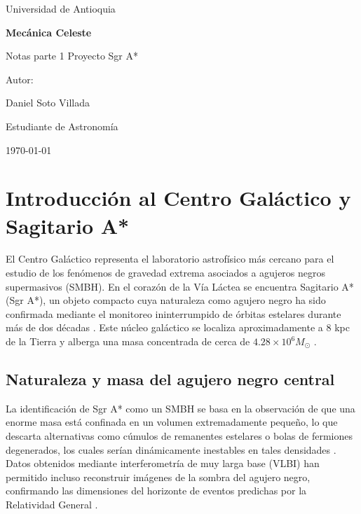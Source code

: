 \documentclass[a4paper]{article}
\begin{document}
\begin{titlepage}
  \centering
  {\Large Universidad de Antioquia\par}
  \vspace{2cm}
  {\huge\bfseries Mecánica Celeste\par}
  \vspace{0.4cm}
  {\Large Notas parte 1 Proyecto Sgr A*\par}
  \vspace{2.5cm}
  {\large Autor:\par}
  \vspace{0.2cm}
  {\large Daniel Soto Villada\par}
  {\large Estudiante de Astronomía\par}
  \vfill
  {\large \today\par}
\end{titlepage}

\newpage
\tableofcontents
\newpage

\section{Introducción al Centro Galáctico y Sagitario A*}

El Centro Galáctico representa el laboratorio astrofísico más cercano para el estudio de los fenómenos de gravedad extrema asociados a agujeros negros supermasivos (SMBH). En el corazón de la Vía Láctea se encuentra Sagitario A* (Sgr A*), un objeto compacto cuya naturaleza como agujero negro ha sido confirmada mediante el monitoreo ininterrumpido de órbitas estelares durante más de dos décadas \cite{gillessen2017update}. Este núcleo galáctico se localiza aproximadamente a 8 kpc de la Tierra y alberga una masa concentrada de cerca de $4.28 \times 10^6 M_\odot$ \cite{gillessen2017update, ciurlo2025sagittarius}.

\subsection{Naturaleza y masa del agujero negro central}
La identificación de Sgr A* como un SMBH se basa en la observación de que una enorme masa está confinada en un volumen extremadamente pequeño, lo que descarta alternativas como cúmulos de remanentes estelares o bolas de fermiones degenerados, los cuales serían dinámicamente inestables en tales densidades \cite{ciurlo2025sagittarius}. Datos obtenidos mediante interferometría de muy larga base (VLBI) han permitido incluso reconstruir imágenes de la sombra del agujero negro, confirmando las dimensiones del horizonte de eventos predichas por la Relatividad General \cite{ciurlo2025sagittarius}.
\end{document}
